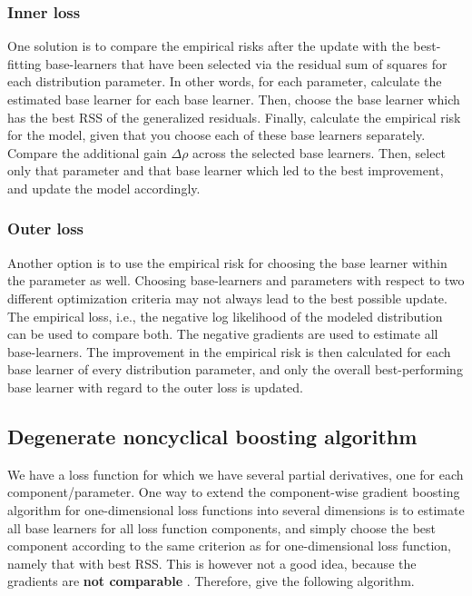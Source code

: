 \subsubsection{Inner loss}
One solution is to compare the empirical risks after the update with the best-fitting base-learners that have been selected via the residual sum of squares for each distribution parameter. In other words, for each parameter, calculate the estimated base learner for each base learner. Then, choose the base learner which has the best RSS of the generalized residuals. Finally, calculate the empirical risk for the model, given that you choose each of these base learners separately. Compare the additional gain $\Delta\rho$ across the selected base learners. Then, select only that parameter and that base learner which led to the best improvement, and update the model accordingly.

\subsubsection{Outer loss}
Another option is to use the empirical risk for choosing the base learner within the parameter as well. Choosing base-learners and parameters with respect to two different optimization criteria may not always lead to the best possible update. The empirical loss, i.e., the negative log likelihood of the modeled distribution can be used to compare both. The negative gradients are used to estimate all base-learners. The improvement in the empirical risk is then calculated for each base learner of every distribution parameter, and only the overall best-performing base learner with regard to the outer loss is updated.


\subsection{Degenerate noncyclical boosting algorithm}
We have a loss function for which we have several partial derivatives, one for each component/parameter. One way to extend the component-wise gradient boosting algorithm for one-dimensional loss functions into several dimensions is to estimate all base learners for all loss function components, and simply choose the best component according to the same criterion as for one-dimensional loss function, namely that with best RSS. This is however not a good idea, because the gradients are \textbf{not comparable} \citep{thomas2018}. Therefore, \citet{thomas2018} give the following algorithm.


